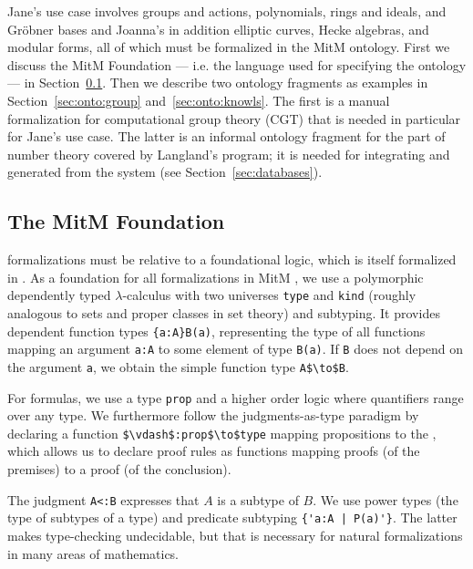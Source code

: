 Jane's use case involves groups and actions, polynomials, rings and ideals, and Gröbner bases and Joanna's in addition elliptic curves, Hecke algebras, and modular forms, all of which must be formalized in the MitM ontology.
First we discuss the MitM Foundation --- i.e. the language used for specifying the ontology --- in Section~\ref{sec:onto:found}.
Then we describe two ontology fragments as examples in Section~\ref{sec:onto:group} and~\ref{sec:onto:knowls}.
The first is a manual formalization for computational group theory (CGT) that is needed in particular for Jane's use case.
The latter is an informal ontology fragment for the part of number theory covered by Langland's program; it is needed for integrating and generated from the \LMFDB system (see Section~\ref{sec:databases}).

\subsection{The MitM Foundation}\label{sec:onto:found}

\OMMT formalizations must be relative to a foundational logic, which is itself formalized in \OMMT.
As a foundation for all formalizations in MitM \cite{mitm:foundation:on}, we use a polymorphic dependently typed $\lambda$-calculus with two universes \lstinline|type| and \lstinline|kind| (roughly analogous to sets and proper classes in set theory) and subtyping.
It provides dependent function types \lstinline|{a:A}B(a)|, representing the type of all functions mapping an argument \lstinline|a:A| to some element of type \lstinline|B(a)|. If \lstinline|B| does not depend on the argument \lstinline|a|, we obtain the simple function type \lstinline[mathescape]|A$\to$B|.

For formulas, we use a type \lstinline|prop| and a higher order logic where quantifiers range over any type.
We furthermore follow the judgments-as-type paradigm by declaring a function \lstinline[mathescape]|$\vdash$:prop$\to$type| mapping propositions to the , which allows us to declare proof rules as functions mapping proofs (of the premises) to a proof (of the conclusion).

The judgment \lstinline|A<:B| expresses that $A$ is a subtype of $B$.
We use power types (the type of subtypes of a type) and predicate subtyping \lstinline?{'a:A | P(a)'}?.
The latter makes type-checking undecidable, but that is necessary for natural formalizations in many areas of mathematics.

